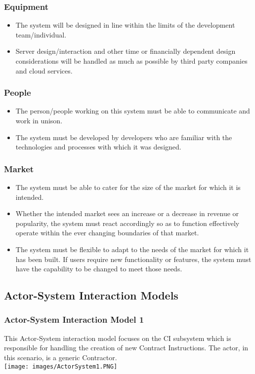 \documentclass[11pt]{article}
\begin{document}
    \subsubsection{Equipment}
    \begin{itemize}
        \item The system will be designed in line within the limits of the development team/individual.
        \item Server design/interaction and other time or financially dependent design considerations will be handled as much as possible by third party companies and cloud services.
    \end{itemize}
    \subsubsection{People}
    \begin{itemize}
        \item The person/people working on this system must be able to communicate and work in unison.
        \item The system must be developed by developers who are familiar with the technologies and processes with which it was designed.
    \end{itemize}
    \subsubsection{Market}
    \begin{itemize}
        \item The system must be able to cater for the size of the market for which it is intended.
        \item Whether the intended market sees an increase or a decrease in revenue or popularity, the system must react accordingly so as to function effectively operate within the ever changing boundaries of that market.
        \item The system must be flexible to adapt to the needs of the market for which it has been built. If users require new functionality or features, the system must have the capability to be changed to meet those needs.
    \end{itemize}
\subsection{Actor-System Interaction Models}
\subsubsection{Actor-System Interaction Model 1}
This Actor-System interaction model focuses on the CI subsystem which is responsible for handling the creation of new Contract Instructions. The actor, in this scenario, is a generic Contractor.\\[0.5cm]
\texttt{[image: images/ActorSystem1.PNG]}
\newline
\end{document}
